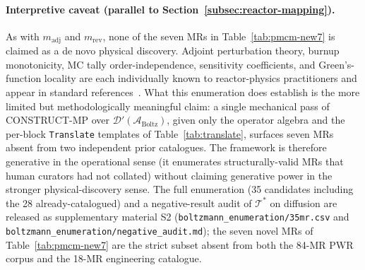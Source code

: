 \paragraph{Interpretive caveat (parallel to Section~\ref{subsec:reactor-mapping}).} As with $m_{\mathrm{adj}}$ and $m_{\mathrm{rev}}$, none of the seven MRs in Table~\ref{tab:pmcm-new7} is claimed as a de novo physical discovery. Adjoint perturbation theory, burnup monotonicity, MC tally order-independence, sensitivity coefficients, and Green's-function locality are each individually known to reactor-physics practitioners and appear in standard references~\cite{BellGlasstone1970, LewisMiller1993}. What this enumeration does establish is the more limited but methodologically meaningful claim: a single mechanical pass of CONSTRUCT-MP over $\mathcal{D}'(\mathcal{A}_{\mathrm{Boltz}})$, given only the operator algebra and the per-block \texttt{Translate} templates of Table~\ref{tab:translate}, surfaces seven MRs absent from two independent prior catalogues. The framework is therefore generative in the operational sense (it enumerates structurally-valid MRs that human curators had not collated) without claiming generative power in the stronger physical-discovery sense. The full enumeration (35 candidates including the 28 already-catalogued) and a negative-result audit of $\mathcal{T}^{*}$ on diffusion are released as supplementary material S2 (\texttt{boltzmann\_enumeration/35mr.csv} and \texttt{boltzmann\_enumeration/negative\_audit.md}); the seven novel MRs of Table~\ref{tab:pmcm-new7} are the strict subset absent from both the 84-MR PWR corpus and the 18-MR engineering catalogue.

